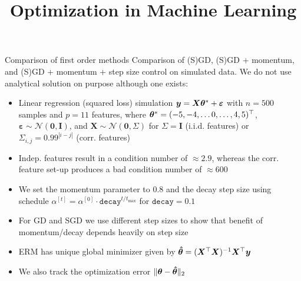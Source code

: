 \documentclass[11pt,compress,t,notes=noshow, xcolor=table]{beamer}
\title{Optimization in Machine Learning}
\begin{document}


\begin{vbframe}{Comparison of first order methods}
Comparison of (S)GD, (S)GD + momentum, and (S)GD + momentum + step size control on simulated data. We do not use analytical solution on purpose although one exists:
{\small
\begin{itemize}
    \item Linear regression (squared loss) simulation $\bm{y} = \bm{X}\bm{\theta}^{\ast} + \bm{\varepsilon}$ with $n=500$ samples and $p=11$ features, where $\bm{\theta}^{\ast}=(-5,-4,\ldots0,\ldots,4,5)^{\top}$, $\bm{\varepsilon} \sim \mathcal{N}(\bm{0}, \bm{I})$, and $\bm{X} \sim \mathcal{N}(\bm{0}, \Sigma)$ for $\Sigma=\bm{I}$ (i.i.d. features) or $\Sigma_{i,j}=0.99^{|i-j|}$ (corr. features)
    \item Indep. features result in a condition number of $\approx 2.9$, whereas the corr. feature set-up produces a bad condition number of $\approx 600$
    \item We set the momentum parameter to $0.8$ and the decay step size using schedule $\alpha^{[t]}=\alpha^{[0]} \cdot \texttt{decay}^{t/t_{\text{max}}}$ for $\texttt{decay}=0.1$
    \item For GD and SGD we use different step sizes to show that benefit of momentum/decay depends heavily on step size
    \item ERM has unique global minimizer given by $\bm{\hat{\theta}} = (\bm{X}^{\top}\bm{X})^{-1}\bm{X}^{\top} \bm{y}$
    \item We also track the optimization error $\Vert \bm{\theta} - \bm{\hat{\theta}} \Vert_2$
\end{itemize}
}
\end{vbframe}

\end{document}
